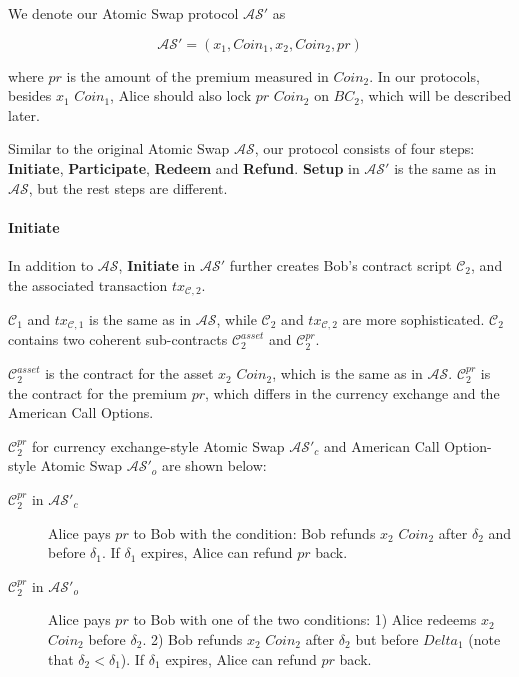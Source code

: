 We denote our Atomic Swap protocol $\mathcal{AS}'$ as

$$\mathcal{AS}' = (x_1, Coin_1, x_2, Coin_2, pr)$$

where $pr$ is the amount of the premium measured in $Coin_2$.
In our protocols, besides $x_1$ $Coin_1$, Alice should also lock $pr$ $Coin_2$ on $BC_2$, which will be described later.

Similar to the original Atomic Swap $\mathcal{AS}$, our protocol consists of four steps:
\textbf{Initiate}, \textbf{Participate}, \textbf{Redeem} and \textbf{Refund}.
\textbf{Setup} in $\mathcal{AS}'$ is the same as in $\mathcal{AS}$, but the rest steps are different. 

\paragraph{\textbf{Initiate}}
In addition to $\mathcal{AS}$, \textbf{Initiate} in $\mathcal{AS}'$ further creates Bob's contract script $\mathcal{C}_2$, and
the associated transaction $tx_{\mathcal{C}, 2}$.

$\mathcal{C}_1$ and $tx_{\mathcal{C}, 1}$ is the same as in $\mathcal{AS}$,
while $\mathcal{C}_2$ and $tx_{\mathcal{C}, 2}$ are more sophisticated.
$\mathcal{C}_2$ contains two coherent sub-contracts $\mathcal{C}^{asset}_2$ and $\mathcal{C}^{pr}_2$.

$\mathcal{C}^{asset}_2$ is the contract for the asset $x_2$ $Coin_2$, which is the same as in $\mathcal{AS}$.
$\mathcal{C}^{pr}_2$ is the contract for the premium $pr$, which differs in the currency exchange and the American Call Options.

$\mathcal{C}^{pr}_2$ for currency exchange-style Atomic Swap $\mathcal{AS}'_{c}$ and American Call Option-style Atomic Swap $\mathcal{AS}'_{o}$ are shown below:

\begin{description}
    \item[$\mathcal{C}^{pr}_2$ in $\mathcal{AS}'_{c}$] Alice pays $pr$ to Bob with the condition:
    Bob refunds $x_2$ $Coin_2$ after $\delta_2$ and before $\delta_1$.
    If $\delta_1$ expires, Alice can refund $pr$ back.
    \item[$\mathcal{C}^{pr}_2$ in $\mathcal{AS}'_{o}$] Alice pays $pr$ to Bob with one of the two conditions:
    1) Alice redeems $x_2$ $Coin_2$ before $\delta_2$.
    2) Bob refunds $x_2$ $Coin_2$ after $\delta_2$ but before $Delta_1$ (note that $\delta_2 < \delta_1$).
    If $\delta_1$ expires, Alice can refund $pr$ back.
\end{description}

